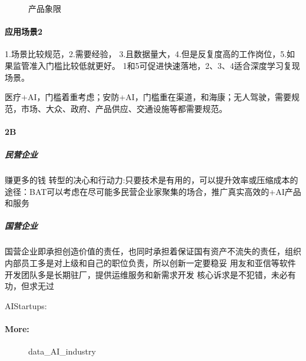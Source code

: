 \documentclass[letterpaper,11pt,english]{sphinxmanual}
\let\sphinxpxdimen\pdfpxdimen\else\newdimen\sphinxpxdimen
\begin{document}
\begin{figure}[H]
\centering
\capstart

\noindent\sphinxincludegraphics[width=600\sphinxpxdimen]{{产品象限}.png}
\caption{产品象限}\label{\detokenize{chapter_project/AI_industry_analysis:id13}}\end{figure}


\paragraph{应用场景2\sphinxfootnotemark[225]}
\label{\detokenize{chapter_project/AI_industry_analysis:id9}}%
\begin{footnotetext}[225]\sphinxAtStartFootnote
{}
%
\end{footnotetext}\ignorespaces 
1.场景比较规范，2.需要经验，
3.且数据量大，4.但是反复度高的工作岗位，5.如果监管准入门槛比较低就更好。
1和5可促进快速落地，2、3、4适合深度学习复现场景。

医疗+AI，门槛着重考虑；安防+AI，门槛重在渠道，和海康；无人驾驶，需要规范，市场、大众、政府、产品供应、交通设施等都需要规范。


\paragraph{2B}
\label{\detokenize{chapter_project/AI_industry_analysis:b}}

\subparagraph{民营企业}
\label{\detokenize{chapter_project/AI_industry_analysis:id10}}
赚更多的钱 转型的决心和行动力:只要技术是有用的，可以提升效率或压缩成本的
途径：BAT可以考虑在尽可能多民营企业家聚集的场合，推广真实高效的+AI产品和服务


\subparagraph{国营企业}
\label{\detokenize{chapter_project/AI_industry_analysis:id11}}
国营企业即承担创造价值的责任，也同时承担着保证国有资产不流失的责任，组织内部员工多是对上级和自己的职位负责，所以创新一定要稳妥
用友和亚信等软件开发团队多是长期驻厂，提供运维服务和新需求开发
核心诉求是不犯错，未必有功，但求无过

AIStartups: 


\paragraph{More:}
\label{\detokenize{chapter_project/AI_industry_analysis:more}}
\begin{figure}[H]
\centering
\capstart

\noindent{}
\caption{data\_AI\_industry}\label{\detokenize{chapter_project/AI_industry_analysis:id14}}\end{figure}
\end{document}
